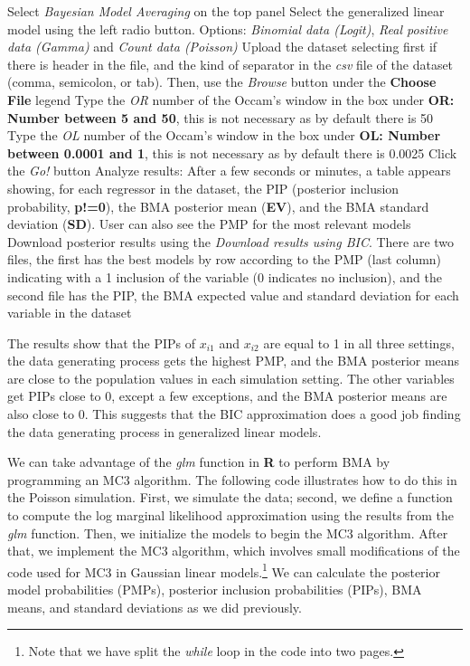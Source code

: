 \begin{algorithm}[h!]
	\caption{Bayesian model averaging in generalized linear models using the Bayesian information criterion}\label{alg:BMABIC}
	\begin{algorithmic}[1]  		 			
		\State Select \textit{Bayesian Model Averaging} on the top panel
		\State Select the generalized linear model using the left radio button. Options: \textit{Binomial data (Logit)}, \textit{Real positive data (Gamma)} and \textit{Count data (Poisson)}
		\State Upload the dataset selecting first if there is header in the file, and the kind of separator in the \textit{csv} file of the dataset (comma, semicolon, or tab). Then, use the \textit{Browse} button under the \textbf{Choose File} legend
		\State Type the \textit{OR} number of the Occam's window in the box under \textbf{OR: Number between 5 and 50}, this is not necessary as by default there is 50
		\State Type the \textit{OL} number of the Occam's window in the box under \textbf{OL: Number between 0.0001 and 1}, this is not necessary as by default there is 0.0025
		\State Click the \textit{Go!} button
		\State Analyze results: After a few seconds or minutes, a table appears showing, for each regressor in the dataset, the PIP (posterior inclusion probability, \textbf{p!=0}), the BMA posterior mean (\textbf{EV}), and the BMA standard deviation (\textbf{SD}). User can also see the PMP for the most relevant models
		\State Download posterior results using the \textit{Download results using BIC}. There are two files, the first has the best models by row according to the PMP (last column) indicating with a 1 inclusion of the variable (0 indicates no inclusion), and the second file has the PIP, the BMA expected value and standard deviation for each variable in the dataset
	\end{algorithmic} 
\end{algorithm}

The results show that the PIPs of $x_{i1}$ and $x_{i2}$ are equal to 1 in all three settings, the data generating process gets the highest PMP, and the BMA posterior means are close to the population values in each simulation setting. The other variables get PIPs close to 0, except a few exceptions, and the BMA posterior means are also close to 0. This suggests that the BIC approximation does a good job finding the data generating process in generalized linear models.
 
We can take advantage of the \textit{glm} function in \textbf{R} to perform BMA by programming an MC3 algorithm. The following code illustrates how to do this in the Poisson simulation. First, we simulate the data; second, we define a function to compute the log marginal likelihood approximation using the results from the \textit{glm} function. Then, we initialize the models to begin the MC3 algorithm. After that, we implement the MC3 algorithm, which involves small modifications of the code used for MC3 in Gaussian linear models.\footnote{Note that we have split the \textit{while} loop in the code into two pages.} We can calculate the posterior model probabilities (PMPs), posterior inclusion probabilities (PIPs), BMA means, and standard deviations as we did previously.

